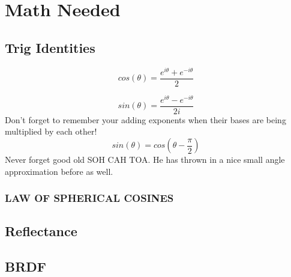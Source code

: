 \documentclass{article}
\begin{document}





\section{Math Needed}
\subsection{Trig Identities}
\begin{equation}
    cos(\theta)= \frac{e^{i \theta}+e^{-i \theta}}{2}
\end{equation}

\begin{equation}
    sin(\theta)= \frac{e^{i \theta}-e^{-i \theta}}{2i}
\end{equation}
Don't forget to remember your adding exponents when their bases are being multiplied by each other!
\begin{equation}
    sin(\theta)= cos(\theta - \frac{\pi}{2}) 
\end{equation}
Never forget good old SOH CAH TOA. 
He has thrown in a nice small angle approximation before as well. 

\subsubsection{LAW OF SPHERICAL COSINES}


\subsection{Reflectance}

\subsection{BRDF}





\end{document}
